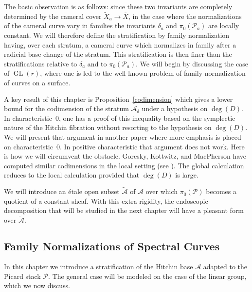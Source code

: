 \documentclass[12pt,english]{smfart}
\numberwithin{equation}{subsection}
\theoremstyle{remark}
\begin{document}
The basic observation is as follows: since these two invariants are completely determined by the cameral cover $\widetilde X_a\rightarrow \bar X$, in the case where the normalizations of the cameral curve vary in families the invariants $\delta_a$ and $\pi_0(\mathcal{P}_a)$ are locally constant. We will therefore define the stratification by family normalization having, over each stratum, a cameral curve which normalizes in family after a radicial base change of the stratum. This stratification is then finer than the stratifications relative to $\delta_a$ and to $\pi_0(\mathcal{P}_a)$. We will begin by discussing the case of $\operatorname{GL}(r)$, where one is led to the well-known problem of family normalization of curves on a surface.

A key result of this chapter is Proposition~\ref{codimension} which gives a lower bound for the codimension of the stratum $\mathcal{A}_\delta$ under a hypothesis on $\deg(D)$. In characteristic~$0$, one has a proof of this inequality based on the symplectic nature of the Hitchin fibration without resorting to the hypothesis on $\deg(D)$. We will present that argument in another paper where more emphasis is placed on characteristic~$0$. In positive characteristic that argument does not work. Here is how we will circumvent the obstacle. Goresky, Kottwitz, and MacPherson have computed similar codimensions in the local setting (see \cite{GKM-codim}). The global calculation reduces to the local calculation provided that $\deg(D)$ is large.

We will introduce an \'etale open subset $\tilde{\mathcal{A}}$ of $\mathcal{A}$ over which $\pi_0(\mathcal{P})$ becomes a quotient of a constant sheaf. With this extra rigidity, the endoscopic decomposition that will be studied in the next chapter will have a pleasant form over $\tilde{\mathcal{A}}$.

\subsection{Family Normalizations of Spectral Curves}
In this chapter we introduce a stratification of the Hitchin base $\mathcal{A}$ adapted to the Picard stack $\mathcal{P}$. The general case will be modeled on the case of the linear group, which we now discuss.
\end{document}
